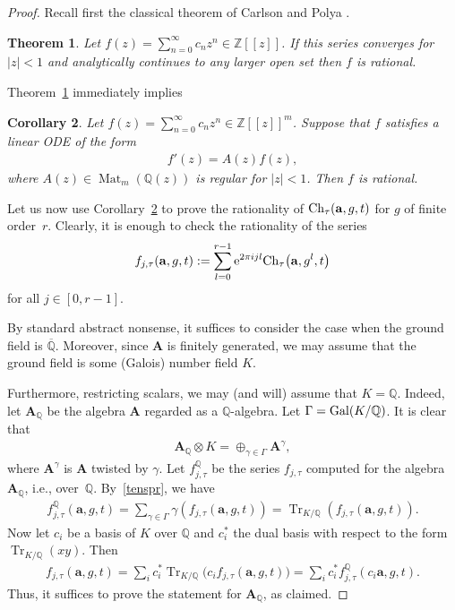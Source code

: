 \documentclass[pdftex]{sigma}
\numberwithin{equation}{section}
\newtheorem{Theorem}{Theorem}[section]
\newtheorem{Corollary}[Theorem]{Corollary}
\begin{document}
\begin{proof} Recall first the classical theorem of Carlson and Polya \cite{C,P}.

\begin{Theorem}\label{t1} Let $f(z)=\sum\limits_{n=0}^\infty c_nz^n\in {\mathbb Z}[[z]]$. If this series converges for $|z|<1$ and analytically continues to any larger open set then $f$ is rational.
\end{Theorem}

Theorem~\ref{t1} immediately implies

\begin{Corollary}\label{c1} Let $f(z)=\sum\limits_{n=0}^\infty c_nz^n\in {\mathbb Z}[[z]]^m$. Suppose that
$f$ satisfies a linear ODE of the form
\begin{gather*}
f'(z)=A(z)f(z),
\end{gather*}
where $A(z)\in \operatorname{Mat}_m({\mathbb Q}(z))$ is regular for $|z|<1$. Then $f$ is rational.
\end{Corollary}

Let us now use Corollary~\ref{c1} to prove the rationality of ${\rm Ch}_\tau({\mathbf a},g,t)$ for $g$ of finite order~$r$. Clearly, it is enough to check the rationality of the series
\begin{gather*}
f_{j,\tau}({\mathbf a},g,t):=\sum_{l=0}^{r-1}{\rm e}^{2\pi ijl}{\rm Ch}_\tau\big({\mathbf a},g^l,t\big)
\end{gather*}
for all $j\in [0,r-1]$.

By standard abstract nonsense, it suffices to consider the case when the ground field is $\overline{{\mathbb Q}}$. Moreover, since ${\mathbf A}$ is finitely generated, we may assume that the ground field is some (Galois) number field $K$.

Furthermore, restricting scalars, we may (and will) assume that $K={\mathbb Q}$. Indeed, let ${\mathbf A}_{{\mathbb Q}}$
be the algebra ${\mathbf A}$ regarded as a ${\mathbb Q}$-algebra. Let $\Gamma={\rm Gal}(K/{\mathbb Q})$.
It is clear that
\begin{gather}\label{tenspr}
{\mathbf A}_{{\mathbb Q}}\otimes K=\oplus_{\gamma\in \Gamma}{\mathbf A}^\gamma,
\end{gather}
where ${\mathbf A}^\gamma$
is ${\mathbf A}$ twisted by $\gamma$. Let $f_{j,\tau}^{{\mathbb Q}}$ be the series $f_{j,\tau}$ computed for the algebra ${\mathbf A}_{{\mathbb Q}}$, i.e., over~${\mathbb Q}$. By~\eqref{tenspr}, we have
\begin{gather*}
f_{j,\tau}^{{\mathbb Q}}({\mathbf a},g,t)=\sum_{\gamma\in \Gamma}\gamma(f_{j,\tau}({\mathbf a},g,t))=\operatorname{Tr}_{K/{\mathbb Q}}(f_{j,\tau}({\mathbf a},g,t)).
\end{gather*}
Now let $c_i$ be a basis of $K$ over ${\mathbb Q}$ and $c_i^*$ the dual basis with respect to the form
$\operatorname{Tr}_{K/{\mathbb Q}}(xy)$. Then
\begin{gather*}
f_{j,\tau}({\mathbf a},g,t)=\sum_i c_i^*\operatorname{Tr}_{K/{\mathbb Q}}\big(c_if_{j,\tau}({\mathbf a},g,t)\big)=\sum_i c_i^*f_{j,\tau}^{{\mathbb Q}}(c_i{\mathbf a},g,t).
\end{gather*}
Thus, it suffices to prove the statement for ${\mathbf A}_{{\mathbb Q}}$, as claimed.


\end{proof}
\end{document}
